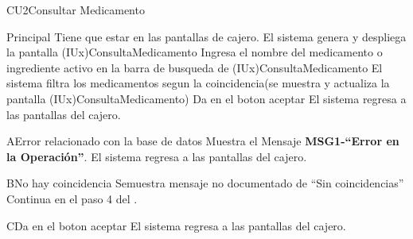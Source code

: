 \begin{UseCase}{CU2}{Consultar Medicamento}{
		
	}
	\end{UseCase}
	\begin{UCtrayectoria}{Principal}
		\UCpaso [\UCactor] Tiene que estar en las pantallas de cajero.
		\UCpaso El sistema genera y despliega la pantalla \IUref(IUx){ConsultaMedicamento} 
		\UCpaso [\UCactor] Ingresa el nombre del medicamento o ingrediente activo en la barra de busqueda de \IUref(IUx){ConsultaMedicamento}		
		\UCpaso El sistema filtra los medicamentos segun la coincidencia(se muestra y actualiza la pantalla \IUref(IUx){ConsultaMedicamento}) 
		\UCpaso [\UCactor] Da en el boton aceptar
		\UCpaso El sistema regresa a las pantallas del cajero.
	\end{UCtrayectoria}

	\begin{UCtrayectoriaA}{A}{Error relacionado con la base de datos}
			\UCpaso Muestra el Mensaje {\bf MSG1-``Error en la Operación''}.
		    \UCpaso El sistema regresa a las pantallas del cajero.
		\end{UCtrayectoriaA}
		\begin{UCtrayectoriaA}{B}{No hay coincidencia}
			\UCpaso Semuestra mensaje no documentado de ``Sin coincidencias''
			\UCpaso Continua en el paso 4 del .
		\end{UCtrayectoriaA}		
		\begin{UCtrayectoriaA}{C}{Da en el boton aceptar}
		\UCpaso El sistema regresa a las pantallas del cajero.
		\end{UCtrayectoriaA}

